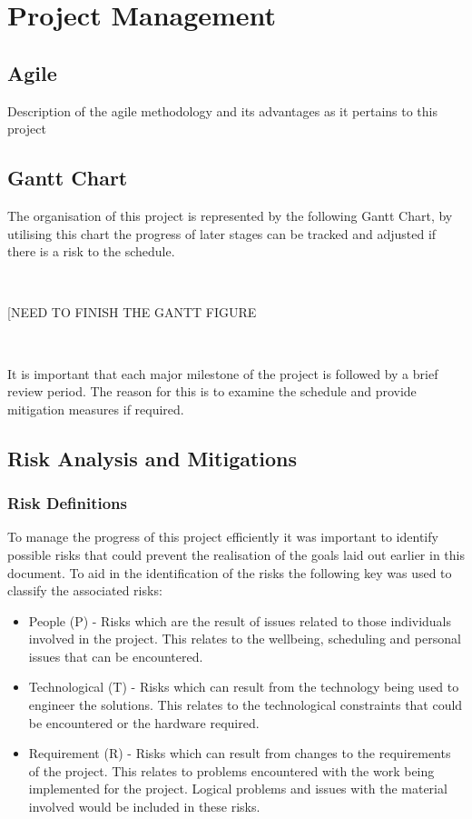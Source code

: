 \documentclass[12pt]{article}  %
\theoremstyle{definition}
\theoremstyle{remark}
\begin{document}
\section{Project Management}\label{ss:back}

\subsection {Agile}

Description of the agile methodology and its advantages as it pertains to this project

\subsection {Gantt Chart}

The organisation of this project is represented by the following Gantt Chart, by utilising this chart the progress of later stages can be tracked and adjusted if there is a risk to the schedule.

\

[NEED TO FINISH THE GANTT FIGURE

\

It is important that each major milestone of the project is followed by a brief review period. The reason for this is to examine the schedule and provide mitigation measures if required.

\subsection {Risk Analysis and Mitigations}

\subsubsection {Risk Definitions}
To manage the progress of this project efficiently it was important to identify possible risks that could prevent the realisation of the goals laid out earlier in this document. To aid in the identification of the risks the following key was used to classify the associated risks:
\begin{itemize}
\item{People (P) - Risks which are the result of issues related to those individuals involved in the project. This relates to the wellbeing, scheduling and personal issues that can be encountered.}
\item{Technological (T) - Risks which can result from the technology being used to engineer the solutions. This relates to the technological constraints that could be encountered or the hardware required.}
\item{Requirement (R)  - Risks which can result from changes to the requirements of the project. This relates to problems encountered with the work being implemented for the project. Logical problems and issues with the material involved would be included in these risks.}
\end{itemize}
\end{document}
